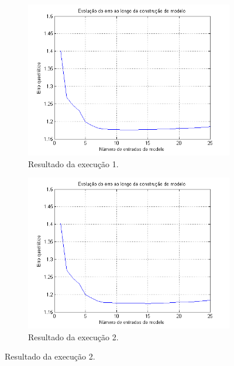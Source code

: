 \FloatBarrier
\begin{figure}[H] 
				
			\centering
			
				\begin{subfigure}{.5\textwidth}
				  \centering
				  \includegraphics[width=1\linewidth]{image/forward1}
				  \caption{Resultado da execução 1.}
				  \label{forward1}
				\end{subfigure}%
				\begin{subfigure}{.5\textwidth}
				  \centering
				  \includegraphics[width=1\linewidth]{image/forward2}
				  \caption{Resultado da execução 2.}
				  \label{forward2}
			\end{subfigure}
			

\end{figure}
